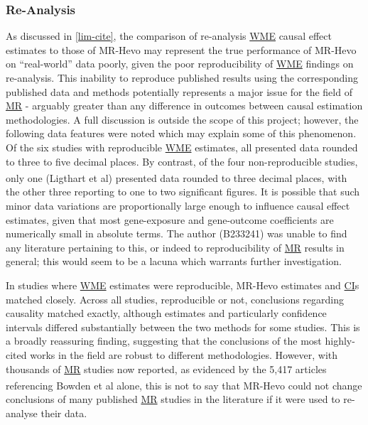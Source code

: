 \documentclass[
]{article}
\begin{document}
\subsubsection{Re-Analysis}\label{re-analysis}

As discussed in \ref{lim-cite}, the comparison of re-analysis \hyperref[acronyms_WME]{WME} causal effect estimates to those of MR-Hevo may represent the true performance of MR-Hevo on ``real-world'' data poorly, given the poor reproducibility of \hyperref[acronyms_WME]{WME} findings on re-analysis. This inability to reproduce published results using the corresponding published data and methods potentially represents a major issue for the field of \hyperref[acronyms_MR]{MR} - arguably greater than any difference in outcomes between causal estimation methodologies. A full discussion is outside the scope of this project; however, the following data features were noted which may explain some of this phenomenon. Of the six studies with reproducible \hyperref[acronyms_WME]{WME} estimates, all presented data rounded to three to five decimal places. By contrast, of the four non-reproducible studies, only one (Ligthart et al\textsuperscript{}) presented data rounded to three decimal places, with the other three reporting to one to two significant figures. It is possible that such minor data variations are proportionally large enough to influence causal effect estimates, given that most gene-exposure and gene-outcome coefficients are numerically small in absolute terms. The author (B233241) was unable to find any literature pertaining to this, or indeed to reproducibility of \hyperref[acronyms_MR]{MR} results in general; this would seem to be a lacuna which warrants further investigation.

In studies where \hyperref[acronyms_WME]{WME} estimates were reproducible, MR-Hevo estimates and \hyperref[acronyms_CI]{CI}s matched closely. Across all studies, reproducible or not, conclusions regarding causality matched exactly, although estimates and particularly confidence intervals differed substantially between the two methods for some studies. This is a broadly reassuring finding, suggesting that the conclusions of the most highly-cited works in the field are robust to different methodologies. However, with thousands of \hyperref[acronyms_MR]{MR} studies now reported, as evidenced by the 5,417 articles referencing Bowden et al\textsuperscript{} alone, this is not to say that MR-Hevo could not change conclusions of many published \hyperref[acronyms_MR]{MR} studies in the literature if it were used to re-analyse their data.
\end{document}
